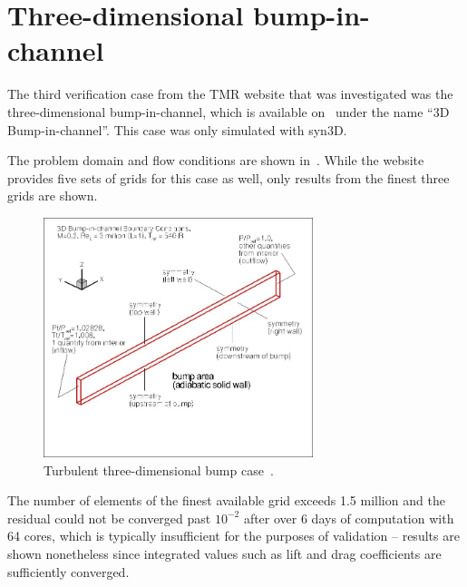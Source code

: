 \section{Three-dimensional bump-in-channel}
\label{sec:syn3dbump}
The third verification case from the TMR website that was investigated was the three-dimensional bump-in-channel, which is available on~\cite{tmr} under the name ``3D Bump-in-channel''. This case was only simulated with syn3D.

The problem domain and flow conditions are shown in~. While the website provides five sets of grids for this case as well, only results from the finest three grids are shown.
\begin{figure}
    \centering
    \includegraphics[width=0.7\textwidth]{figs/3dbump/bump3dBCpic1.jpg}
    \caption{Turbulent three-dimensional bump case~\cite{tmr}.}
    \label{fig:3dbump}
\end{figure}

The number of elements of the finest available grid exceeds 1.5 million and the residual could not be converged past $10^{-2}$ after over 6 days of computation with 64 cores, which is typically insufficient for the purposes of validation -- results are shown nonetheless since integrated values such as lift and drag coefficients are sufficiently converged.

